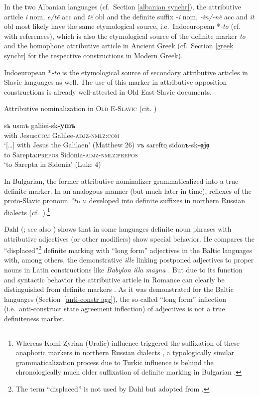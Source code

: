 {In the two Albanian languages (cf.~Section \ref{albanian synchr}), the attributive article \textit{i} {\sc nom}, \textit{e/të} {\sc acc} and \textit{të} {\sc obl} and the definite suffix \textit{-i} {\sc nom}, \textit{-in/-në} {\sc acc} and \textit{it} {\sc obl} most likely have the same etymological source, i.e.~Indoeuropean *\textit{-to} (cf.~\citet[165]{himmelmann1997} with references), which is also the etymological source of the definite marker \textit{to} and the homophone attributive article in Ancient Greek (cf.~Section \ref{greek synchr} for the respective constructions in Modern Greek).

Indoeuropean *\textit{-to} is the etymological source of secondary attributive articles in Slavic languages as well. The use of this marker in attributive apposition constructions is already well-attested in Old East-Slavic documents.
\begin{exe}
\ex Attributive nominalization in \textsc{Old E-Slavic} (cit. \citealt[214]{mendoza2004})
\begin{xlist}
\ex
\gll	[\dots] sъ usmъ galiiei-sk\textbf{-ymъ}\\
	{ } with Jesus:\textsc{com} Galilee-\textsc{adjz}-\textsc{nmlz:com}\\
\glt 	‘[\dots] with Jesus the Galilaen’ (Matthew 26)
\ex 
\gll	vъ sarefto̜ sidonъ-sk\textbf{-o̜jo̜}\\
	to Sarepta:\textsc{prepos} Sidonia-\textsc{adjz}-\textsc{nmlz:prepos}\\
\glt 	‘to Sarepta in Sidonia’ (Luke 4)
\end{xlist}
\end{exe}
In Bulgarian, the former attributive nominalizer grammaticalized into a true definite marker. In an analogous manner (but much later in time), reflexes of the proto-Slavic pronoun \textit{*tъ} \textsc{m} developed into definite suffixes in northern Russian dialects (cf.~\citealt
{leinonen2006a}).\footnote{Whereas Komi-Zyrian (Uralic) influence triggered the suffixation of these anaphoric markers in northern Russian dialects \citep
{leinonen2006a}, a typologically similar grammaticalization process due to Turkic influence is behind the chronologically much older suffixation of definite marking in Bulgarian \citep[114–122]{kusmenko2008}.}

Dahl (\citeyear[149–152]{dahl2003}; see also \citealt[115]{dahl2007}) shows that in some languages definite noun phrases with attributive adjectives (or other modifiers) show special behavior. He compares the “displaced”\footnote{The term “displaced” is not used by Dahl but adopted from \citet[114–116]{melcuk2006}.} definite marking with “long form” adjectives in the Baltic languages with, among others, the demonstrative \textit{ille} linking postponed adjectives to proper nouns in Latin constructions like \textit{Babylon illa magna} \cite[150]{dahl2003}. But due to its function and syntactic behavior the attributive article in Romance can clearly be distinguished from definite markers \citep[329]{gamillscheg1937}. As it was demonstrated for the Baltic languages (Section~\ref{anti-constr agr}), the so-called “long form” inflection (i.e.~anti-construct state agreement inflection) of adjectives is not a true definiteness marker.

}
